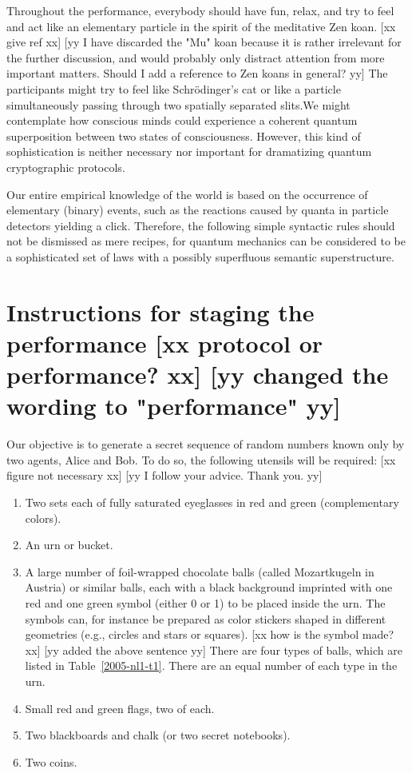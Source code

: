 \documentclass[prb,amssymb,preprint]{revtex4}
\begin{document}
Throughout the performance, everybody should have fun, relax, and try to
feel and act like an elementary particle in the spirit of the meditative
Zen koan.
[xx give ref xx]
[yy I have discarded the "Mu" koan because it is rather irrelevant for the further discussion,
and would probably only distract attention from more important matters.
Should I add a reference to Zen koans in general? yy]
The participants might try to feel like
Schr\"{o}dinger's cat\cite{schrodinger} or like a particle simultaneously
passing through two spatially separated slits.We might
contemplate how conscious minds could experience a coherent quantum
superposition between two states of consciousness. However, this kind of
sophistication is neither necessary nor important for dramatizing quantum
cryptographic protocols.

Our entire empirical knowledge of the world is based on the occurrence of
elementary (binary) events, such as the reactions caused by quanta in
particle detectors yielding a click. Therefore, the following simple
syntactic rules should not be dismissed as
mere recipes, for quantum mechanics can be
considered to be a
sophisticated set of laws with a possibly superfluous\cite{fuchs-peres}
semantic superstructure.

\section{Instructions for staging the performance
[xx protocol or performance? xx]
[yy changed the wording to "performance" yy]
}

Our objective is to generate a secret sequence of random numbers known only
by two agents, Alice and Bob. To do so, the following
utensils will be required:
[xx figure not necessary xx]
[yy I follow your advice. Thank you. yy]

\begin{enumerate}

\item Two sets each of fully saturated eyeglasses in red and green
(complementary colors).

\item An urn or bucket.

\item A large number of foil-wrapped chocolate balls (called
Mozartkugeln in Austria) or similar balls, each with a black background
imprinted with one red and one green symbol (either 0 or 1) to be placed
inside the urn.
The symbols can, for instance be prepared as color stickers shaped in different geometries
(e.g., circles and stars or squares).
[xx how is the symbol made? xx]
[yy added the above sentence yy]
There are four types of
balls, which are listed in Table~\ref{2005-nl1-t1}. There are an equal
number of each type in the urn.

\item Small red and green flags, two of each.

\item Two blackboards and chalk (or two secret notebooks).

\item Two coins.

\end{enumerate}
\end{document}
